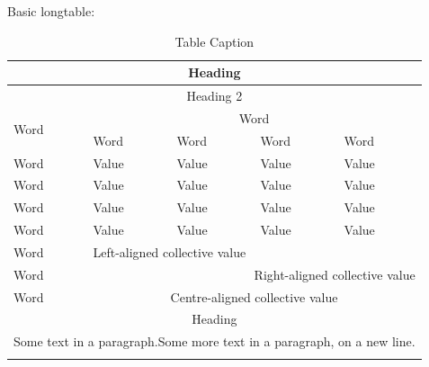 \documentclass[11pt, english]{article}
\begin{document}
	Basic longtable:

        \begin{center}
                \scriptsize
        \begin{longtable}{p{3cm}|p{2cm}p{2cm}p{2cm}p{2cm}}
                \hline
                \hline
                \multicolumn{5}{c}{Heading}\\
                \hline
                \hline                 
                \multicolumn{5}{c}{Heading 2}\\
                \hline
                \multirow{2}{*}{Word} & \multicolumn{4}{c}{Word}\\
                \cline{2-5}                  
                & Word & Word & Word & Word\\
                \hline
                Word & Value & Value & Value & Value\\
                Word & Value & Value & Value & Value\\
                Word & Value & Value & Value & Value\\
                Word & Value & Value & Value & Value\\
                \hline
                Word & \multicolumn{4}{l}{Left-aligned collective value}\\        
                Word & \multicolumn{4}{r}{Right-aligned collective value}\\        
                Word & \multicolumn{4}{c}{Centre-aligned collective value}\\                                     
		\hline                                                                           
                \hline
                \multicolumn{5}{c}{Heading}\\
                \hline
                \hline                                                                                           
		\multicolumn{5}{p{11.5cm}}{Some text in a paragraph.\newline Some more text in a paragraph, on a new line.}\\                                               
                \hline                 
                \caption{Table Caption}
        \end{longtable}                
        \end{center}
\end{document}
